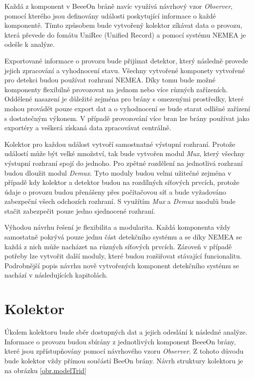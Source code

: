  Každá z komponent v BeeeOn bráně navíc využívá návrhový vzor \textit{Observer}, pomocí kterého jsou
 definovány události poskytující informace o každé komponentě. 
 Tímto způsobem bude vytvořený kolektor zíkávat data o provozu, která
 převede do fomátu UniRec (Unified Record) a pomocí systému NEMEA je odešle k analýze.
 
 Exportované informace o provozu bude přijímat detektor, který následně provede jejich zpracování a 
 vyhodnocení stavu. Všechny vytvořené komponety vytvořené pro detekci budou používat rozhraní 
 NEMEA. Díky tomu bude možné komponenty flexibilně provozovat na jednom nebo více různých zařízeních.
 Oddělené nasazení je důležité zejména pro brány s omezenými prostředky, které mohou provádět 
 pouze export dat a o vyhodnocení se bude starat odlišné zařízení s dostatečným výkonem. V případě 
 provozování více bran lze brány používat jako exportéry a veškerá získaná data zpracovávat 
 centrálně. 
 
 Kolektor pro každou událost vytvoří samostnatné výstupní rozhraní. Protože událostí může být 
 velké množství, tak bude vytvořen modul \textit{Mux}, který všechny výstupní rozhraní spojí do jednoho. 
 Pro zpětné rozdělení na jednotlivá rozhraní budou dloužit modul \textit{Demux}. Tyto moduly budou velmi užitečné
 zejména v případě kdy kolektor a detektor budou na rozdílných síťových prvcích, protože údaje 
 o provozu budou přenášeny přes počítačovou síť a bude vyžadováno zabezpeční všech odchozích
 rozhraní. S využítím \textit{Mux} a \textit{Demux} modulů bude stačit zabezpečit pouze jedno sjednocené rozhraní. 
 
 Výhodou návrhu řešení je flexibilita a modularita. Každá komponenta vždy samostatně pokrývá pouze jednu
 část detekčního systému a se díky NEMEA se každá z nich může nacházet na různých síťových prvcích. Zároveň
 v případě potřeby lze vytvořit další moduly, které budou rozšiřovat stávající funcionalitu.
 Podrobnější popis návrhu nově vytvořených komponent detekčního systému se nachází v následujících kapitolách.
 
 \section{Kolektor}
 Úkolem kolektoru bude sběr dostupných dat a jejich odeslání k následné analýze. Informace o 
 provozu budou sbírány z jednotlivých komponent BeeeOn brány, které jsou zpřístupňovány pomocí 
 návrhového vzoru \textit{Observer}. Z tohoto důvodu bude kolektor vždy přímou součástí BeeOn brány. 
 Návrh struktury kolektoru je na obrázku \ref{obr.modelTrid}
 
